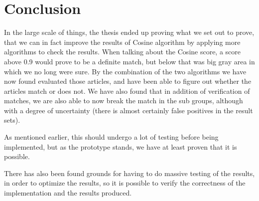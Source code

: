 \chapter{Conclusion}
In the large scale of things, the thesis ended up proving what we set out to prove, that we can in fact improve the results of Cosine algorithm by applying more algorithms to check the results. When talking about the Cosine score, a score above 0.9 would prove to be a definite match, but below that was big gray area in which we no long were sure. By the combination of the two algorithms we have now found evaluated those articles, and have been able to figure out whether the articles match or does not. We have also found that in addition of verification of matches, we are also able to now break the match in the sub groups, although with a degree of uncertainty (there is almost certainly false positives in the result sets). 

As mentioned earlier, this should undergo a lot of testing before being implemented, but as the prototype stands, we have at least proven that it is possible.

There has also been found grounds for having to do massive testing of the results, in order to optimize the results, so it is possible to verify the correctness of the implementation and the results produced.